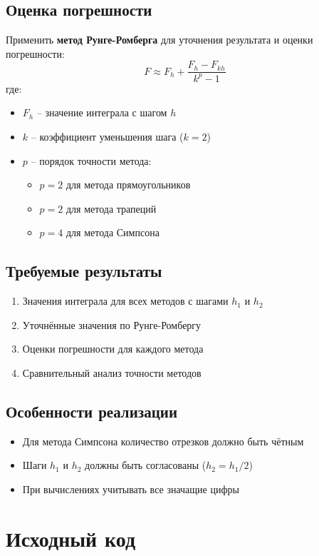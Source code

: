 \subsection*{Оценка погрешности}
Применить \textbf{метод Рунге-Ромберга} для уточнения результата и оценки погрешности:
\[ F \approx F_h + \frac{F_h - F_{kh}}{k^p - 1} \]
где:
\begin{itemize}
\item $F_h$ -- значение интеграла с шагом $h$
\item $k$ -- коэффициент уменьшения шага ($k=2$)
\item $p$ -- порядок точности метода:
\begin{itemize}
\item $p=2$ для метода прямоугольников
\item $p=2$ для метода трапеций
\item $p=4$ для метода Симпсона
\end{itemize}
\end{itemize}

\subsection*{Требуемые результаты}
\begin{enumerate}
\item Значения интеграла для всех методов с шагами $h_1$ и $h_2$
\item Уточнённые значения по Рунге-Ромбергу
\item Оценки погрешности для каждого метода
\item Сравнительный анализ точности методов
\end{enumerate}

\subsection*{Особенности реализации}
\begin{itemize}
\item Для метода Симпсона количество отрезков должно быть чётным
\item Шаги $h_1$ и $h_2$ должны быть согласованы ($h_2 = h_1/2$)
\item При вычислениях учитывать все значащие цифры
\end{itemize}

\section*{Исходный код}

